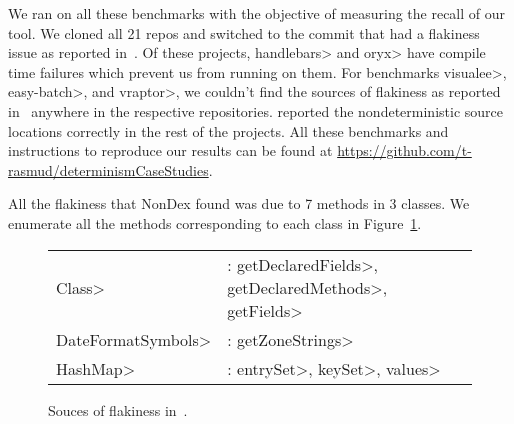 We ran \TheDeterminismChecker on all these benchmarks with the objective
of measuring the recall of our tool. We cloned all 21 repos and switched to the commit that had a flakiness issue as reported 
in~\cite{nondex}. Of these projects, \<handlebars> and \<oryx> have compile time failures which prevent us from running \TheDeterminismChecker on them. For benchmarks \<visualee>, \<easy-batch>, and \<vraptor>, we couldn't find
the sources of flakiness as reported in~\cite{nondex} anywhere in the respective repositories.
\TheDeterminismChecker reported the nondeterministic source locations correctly in the rest of the projects.
All these benchmarks and instructions to reproduce our results can be found at \href{https://github.com/t-rasmud/determinismCaseStudies}{https://github.com/t-rasmud/determinismCaseStudies}.

All the flakiness that NonDex found was due to 7 methods in 3 classes. We enumerate all the methods corresponding to
each class in Figure~\ref{fig:flaky-sources}.
\begin{figure}
    \begin{tabular}{lll}
        \<Class> & : \<getDeclaredFields>, \<getDeclaredMethods>, \<getFields> \\
        \<DateFormatSymbols> & : \<getZoneStrings> \\
        \<HashMap> & : \<entrySet>, \<keySet>, \<values>
    \end{tabular}
\caption{Souces of flakiness in~\cite{nondex}.}
\label{fig:flaky-sources}
\end{figure}

